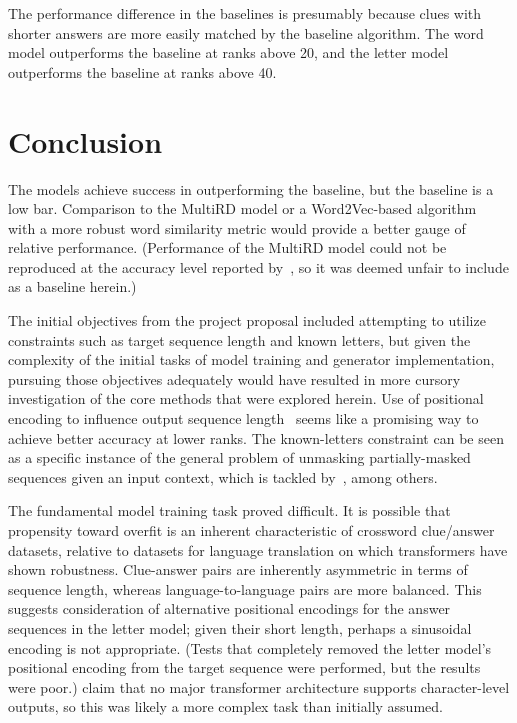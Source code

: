 \documentclass[letterpaper]{article} %
\begin{document}
\begin{NoHyper}
The performance difference in the baselines is presumably because clues with
shorter answers are more easily matched by the baseline algorithm.
The word model outperforms the baseline at ranks above 20, and the letter model
outperforms the baseline at ranks above 40.

\section{Conclusion}
\label{sec:conclusion}

The models achieve success in outperforming the baseline, but the baseline is a low bar.
Comparison to the MultiRD model or a Word2Vec-based algorithm~\cite{mikolov2013efficient} with a more robust word similarity metric would provide a better gauge of relative performance.
(Performance of the MultiRD model could not be reproduced at the accuracy level reported by~\citeauthor{zhang2019multichannel}, so it was deemed unfair to include as a baseline herein.)

The initial objectives from the project proposal included attempting to utilize constraints such as target sequence
length and known letters, but given the complexity of the initial tasks of model training and generator implementation,
pursuing those objectives adequately would have resulted in more cursory investigation of the core
methods that were explored herein.
Use of positional encoding to influence output sequence length~\cite{takase2019positional} seems like a promising way to achieve better accuracy at lower ranks.
The known-letters constraint can be seen as a specific instance of the general problem of unmasking partially-masked
sequences given an input context, which is tackled by~\citealp{raffel2023exploring}, among others.

The fundamental model training task proved difficult.
It is possible that propensity toward overfit is an inherent characteristic of crossword clue/answer datasets, relative
to datasets for language translation on which transformers have shown robustness.
Clue-answer pairs are inherently asymmetric in terms of sequence length, whereas language-to-language pairs are more balanced.
This suggests consideration of alternative positional encodings for the answer sequences in the letter model;
given their short length, perhaps a sinusoidal encoding is not appropriate.
(Tests that completely removed the letter model's positional encoding from the target sequence were performed, but the results were poor.)
\citeauthor{kulshreshtha2022across} claim that no major transformer architecture supports character-level outputs, so
this was likely a more complex task than initially assumed.


\end{NoHyper}
\end{document}
